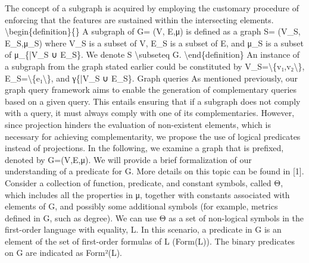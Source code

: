 \documentclass{article}%
\begin{document}
The concept of a subgraph is acquired by employing the customary procedure of enforcing that the features are sustained within the intersecting elements.\newline%
\newline%
\textbackslash{}begin\{definition\}\{\}\newline%
A subgraph of G= (V, E,μ) is defined as a graph S= (V\_S, E\_S,μ\_S) where V\_S is a subset of V, E\_S is a subset of E, and μ\_S is a subset of μ\_\{|V\_S ∪ E\_S\}. We denote S \textbackslash{}subseteq G.\newline%
\textbackslash{}end\{definition\}\newline%
\newline%
An instance of a subgraph from the graph stated earlier could be constituted by V\_S=\textbackslash{}\{v₁,v₂\textbackslash{}\}, E\_S=\textbackslash{}\{e₁\textbackslash{}\}, and γ\{|V\_S ∪ E\_S\}.\newline%
\newline%
Graph queries\newline%
\newline%
As mentioned previously, our graph query framework aims to enable the generation of complementary queries based on a given query. This entails ensuring that if a subgraph does not comply with a query, it must always comply with one of its complementaries. However, since projection hinders the evaluation of non{-}existent elements, which is necessary for achieving complementarity, we propose the use of logical predicates instead of projections.\newline%
\newline%
In the following, we examine a graph that is prefixed, denoted by G=(V,E,μ). We will provide a brief formalization of our understanding of a predicate for G. More details on this topic can be found in {[}1{]}.\newline%
\newline%
Consider a collection of function, predicate, and constant symbols, called Θ, which includes all the properties in μ, together with constants associated with elements of G, and possibly some additional symbols (for example, metrics defined in G, such as degree). We can use Θ as a set of non{-}logical symbols in the first{-}order language with equality, L. In this scenario, a predicate in G is an element of the set of first{-}order formulas of L (Form(L)). The binary predicates on G are indicated as Form²(L).\newline%
\newline%
\end{document}
